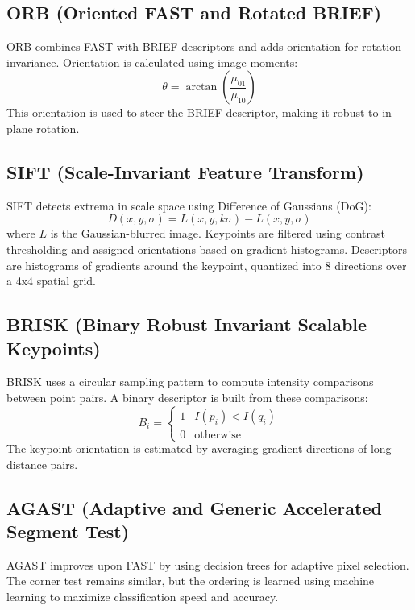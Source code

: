 \subsection{ORB (Oriented FAST and Rotated BRIEF)}
ORB \cite{ORB} combines FAST with BRIEF descriptors and adds orientation for rotation invariance. Orientation is calculated using image moments:
\begin{equation}
\theta = \arctan\left(\frac{\mu_{01}}{\mu_{10}}\right)
\end{equation}
This orientation is used to steer the BRIEF descriptor, making it robust to in-plane rotation.

\subsection{SIFT (Scale-Invariant Feature Transform)}
SIFT \cite{SIFT} detects extrema in scale space using Difference of Gaussians (DoG):
\begin{equation}
D(x, y, \sigma) = L(x, y, k\sigma) - L(x, y, \sigma)
\end{equation}
where $L$ is the Gaussian-blurred image. Keypoints are filtered using contrast thresholding and assigned orientations based on gradient histograms.
Descriptors are histograms of gradients around the keypoint, quantized into 8 directions over a 4x4 spatial grid.

\subsection{BRISK (Binary Robust Invariant Scalable Keypoints)}
BRISK \cite{BRISK} uses a circular sampling pattern to compute intensity comparisons between point pairs. A binary descriptor is built from these comparisons:
\begin{equation}
B_i = \begin{cases} 1 & I(p_i) < I(q_i) \\ 0 & \text{otherwise} \end{cases}
\end{equation}
The keypoint orientation is estimated by averaging gradient directions of long-distance pairs.

\subsection{AGAST (Adaptive and Generic Accelerated Segment Test)}
AGAST \cite{AGAST} improves upon FAST by using decision trees for adaptive pixel selection. The corner test remains similar, but the ordering is learned using machine learning to maximize classification speed and accuracy.

